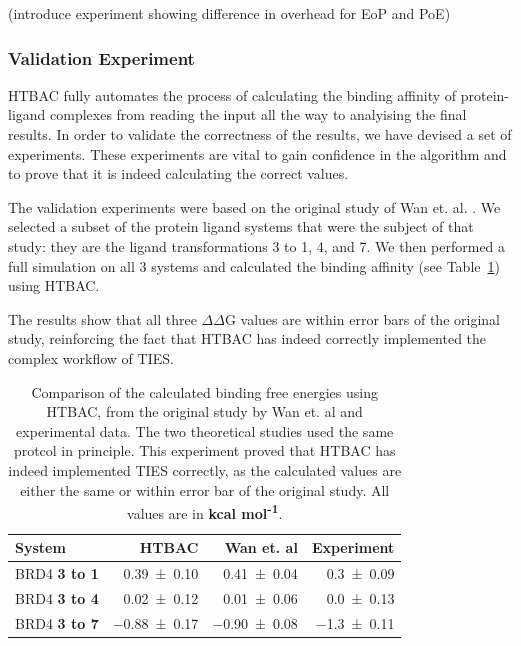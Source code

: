 (introduce experiment showing difference in overhead for EoP and PoE)


\subsubsection{Validation Experiment}


HTBAC fully automates the process of calculating the binding affinity of
protein-ligand complexes from reading the input all the way to analyising the
final results. In order to validate the correctness of the results, we have
devised a set of experiments. These experiments are vital to gain confidence
in the algorithm and to prove that it is indeed calculating the correct
values.

The validation experiments were based on the original study of Wan et. al.
\cite{Wan2017brd4}. We selected a subset of the protein ligand systems that
were the subject of that study: they are the ligand transformations 3 to 1,
4, and 7. We then performed a full simulation on all 3 systems and calculated
the binding affinity (see Table~\ref{tab:exp2}) using HTBAC.

The results show that all three $\Delta \Delta$G values are within error bars
of the original study, reinforcing the fact that HTBAC has indeed correctly
implemented the complex workflow of TIES.

\begin{table}
  \centering
  \begin{tabular}{l@{\hskip 1in}r@{\hskip 0.2in}r@{\hskip 0.2in}r}
    \toprule
    System & HTBAC & Wan et. al & Experiment \\
    \midrule
    BRD4 \textbf{3 to 1} & \num{0.39 +- 0.10} &   \num{0.41 +- 0.04} &  \num{0.3 +- 0.09} \\
    BRD4 \textbf{3 to 4} & \num{0.02 +- 0.12} &   \num{0.01 +- 0.06} &  \num{0.0 +- 0.13} \\
    BRD4 \textbf{3 to 7} & \num{-0.88 +- 0.17} &  \num{-0.90 +- 0.08} & \num{-1.3 +- 0.11} \\
    \bottomrule
  \end{tabular}
  \caption{Comparison of the calculated binding free energies using HTBAC,
  from the original study by Wan et. al and experimental data. The two
  theoretical studies used the same protcol in principle. This experiment
  proved that HTBAC has indeed implemented TIES correctly, as the calculated
  values are either the same or within error bar of the original study. All
  values are in \textbf{kcal mol\textsuperscript{-1}}.}
  \label{tab:exp2}
\end{table}

